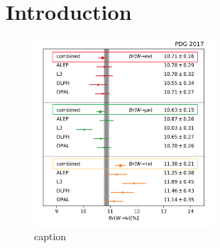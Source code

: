 \chapter{Introduction}
\label{sec:introduction}

\begin{figure}[ht]
    \centering
    \includegraphics[width=0.6\textwidth]{chapters/Introduction/chapterFigures/wdecay.png}
    \caption{caption}
    \label{fig:introduction:wbr}
\end{figure}
